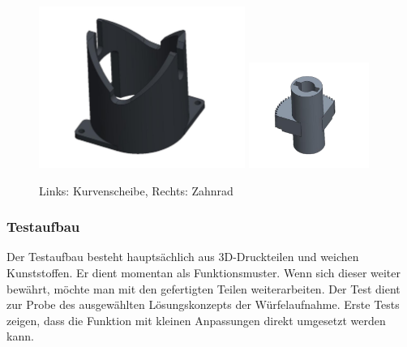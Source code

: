 \documentclass[../../main.tex]{subfiles}
\begin{document}
        \begin{figure}[H]
            \centering
            \includegraphics[width=0.6\textwidth]{../../images/Kran/Kurvenscheibe_3.JPG}
            \includegraphics[width=0.35\textwidth]{../../images/Kran/Zahnrad_3.JPG}
            \caption {Links: Kurvenscheibe,  Rechts: Zahnrad}
        \end{figure}
        \pagebreak


        \subsubsection{Testaufbau}
        Der Testaufbau besteht hauptsächlich aus 3D-Druckteilen und weichen Kunststoffen. Er dient momentan als Funktionsmuster. Wenn sich dieser weiter bewährt, möchte man mit den gefertigten Teilen weiterarbeiten. Der Test dient zur Probe des ausgewählten Lösungskonzepts der Würfelaufnahme. Erste Tests zeigen, dass die Funktion mit kleinen Anpassungen direkt umgesetzt werden kann.
\end{document}
